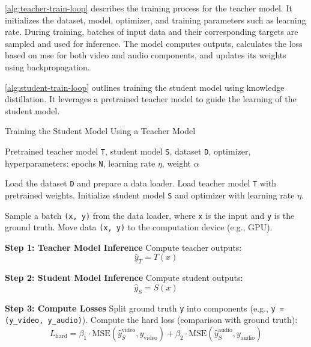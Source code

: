 \documentclass{ioereport}
\begin{document}
\autoref{alg:teacher-train-loop} describes the training process for the teacher model. It initializes the dataset, model, optimizer, and training parameters such as learning rate. During training, batches of input data and their corresponding targets are sampled and used for inference. The model computes outputs, calculates the loss based on \gls{mse} for both video and audio components, and updates its weights using backpropagation. 

\autoref{alg:student-train-loop} outlines training the student model using knowledge distillation. It leverages a pretrained teacher model to guide the learning of the student model.
\begin{algorithm}[ht!]
    \caption{Training the Student Model Using a Teacher Model}
    \label{alg:student-train-loop}
    \begin{algorithmic}[1]
        \REQUIRE Pretrained teacher model \texttt{T}, student model \texttt{S}, dataset \texttt{D}, optimizer, hyperparameters: epochs \texttt{N}, learning rate \texttt{$\eta$}, weight \texttt{$\alpha$}
    
        \STATE Load the dataset \texttt{D} and prepare a data loader.
        \STATE Load teacher model \texttt{T} with pretrained weights.
        \STATE Initialize student model \texttt{S} and optimizer with learning rate \texttt{$\eta$}.
    
            \STATE Sample a batch \texttt{(x, y)} from the data loader, where \texttt{x} is the input and \texttt{y} is the ground truth.
            \STATE Move data \texttt{(x, y)} to the computation device (e.g., GPU).
    
            \STATE \textbf{Step 1: Teacher Model Inference}
            \STATE Compute teacher outputs:
            \[
            \hat{y}_T = T(x)
            \]
    
            \STATE \textbf{Step 2: Student Model Inference}
            \STATE Compute student outputs:
            \[
            \hat{y}_S = S(x)
            \]
    
            \STATE \textbf{Step 3: Compute Losses}
            \STATE Split ground truth \texttt{y} into components (e.g., \texttt{y = (y\_video, y\_audio)}).
            \STATE Compute the hard loss (comparison with ground truth):
            \[
            L_\text{hard} = \beta_1 \cdot \text{MSE}(\hat{y}_S^\text{video}, y_\text{video}) + 
                            \beta_2 \cdot \text{MSE}(\hat{y}_S^\text{audio}, y_\text{audio})
            \]


\end{algorithmic}
\end{algorithm}
\end{document}
